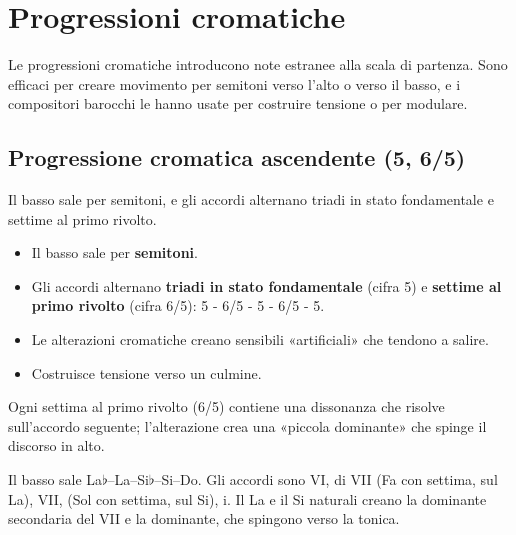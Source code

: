 \chapter{Progressioni cromatiche}
\label{chap:progressioni_cromatiche}

Le progressioni cromatiche introducono note estranee alla scala di partenza. Sono efficaci per creare movimento per semitoni verso l'alto o verso il basso, e i compositori barocchi le hanno usate per costruire tensione o per modulare.

\section{Progressione cromatica ascendente (5, 6/5)}
\label{subsec:progressione_cromatica_ascendente}

Il basso sale per semitoni, e gli accordi alternano triadi in stato fondamentale e settime al primo rivolto.

\begin{regola}
	\label{reg:progressione_cromatica_asc}
	\begin{itemize}
		\item Il basso sale per \textbf{semitoni}.
		\item Gli accordi alternano \textbf{triadi in stato fondamentale} (cifra 5) e \textbf{settime al primo rivolto} (cifra 6/5): 5 - 6/5 - 5 - 6/5 - 5.
		\item Le alterazioni cromatiche creano sensibili «artificiali» che tendono a salire.
		\item Costruisce tensione verso un culmine.
	\end{itemize}
	Ogni settima al primo rivolto (6/5) contiene una dissonanza che risolve sull'accordo seguente; l'alterazione crea una «piccola dominante» che spinge il discorso in alto.
\end{regola}

\begin{esempio}
	\label{ex:progressione_cromatica_asc}
	Il basso sale La$\flat$--La--Si$\flat$--Si--Do. Gli accordi sono VI,  di VII (Fa con settima, sul La), VII,  (Sol con settima, sul Si), i. Il La e il Si naturali creano la dominante secondaria del VII e la dominante, che spingono verso la tonica.
\end{esempio}

